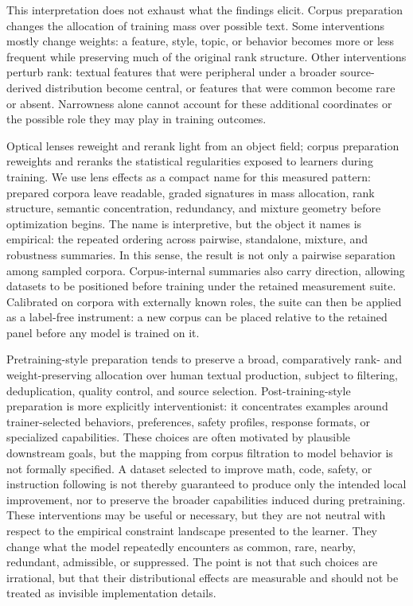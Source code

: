 \documentclass[11pt]{article}
\begin{document}
This interpretation does not exhaust what the findings elicit. Corpus preparation changes the allocation of training mass over possible text. Some interventions mostly change weights: a feature, style, topic, or behavior becomes more or less frequent while preserving much of the original rank structure. Other interventions perturb rank: textual features that were peripheral under a broader source-derived distribution become central, or features that were common become rare or absent. Narrowness alone cannot account for these additional coordinates or the possible role they may play in training outcomes.

Optical lenses reweight and rerank light from an object field; corpus preparation reweights and reranks the statistical regularities exposed to learners during training. We use lens effects as a compact name for this measured pattern: prepared corpora leave readable, graded signatures in mass allocation, rank structure, semantic concentration, redundancy, and mixture geometry before optimization begins. The name is interpretive, but the object it names is empirical: the repeated ordering across pairwise, standalone, mixture, and robustness summaries. In this sense, the result is not only a pairwise separation among sampled corpora. Corpus-internal summaries also carry direction, allowing datasets to be positioned before training under the retained measurement suite. Calibrated on corpora with externally known roles, the suite can then be applied as a label-free instrument: a new corpus can be placed relative to the retained panel before any model is trained on it.

Pretraining-style preparation tends to preserve a broad, comparatively rank- and weight-preserving allocation over human textual production, subject to filtering, deduplication, quality control, and source selection. Post-training-style preparation is more explicitly interventionist: it concentrates examples around trainer-selected behaviors, preferences, safety profiles, response formats, or specialized capabilities. These choices are often motivated by plausible downstream goals, but the mapping from corpus filtration to model behavior is not formally specified. A dataset selected to improve math, code, safety, or instruction following is not thereby guaranteed to produce only the intended local improvement, nor to preserve the broader capabilities induced during pretraining. These interventions may be useful or necessary, but they are not neutral with respect to the empirical constraint landscape presented to the learner. They change what the model repeatedly encounters as common, rare, nearby, redundant, admissible, or suppressed. The point is not that such choices are irrational, but that their distributional effects are measurable and should not be treated as invisible implementation details.
\end{document}
